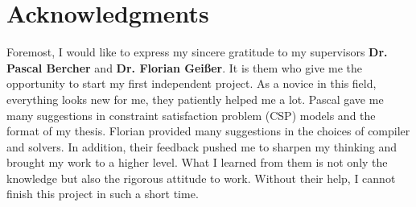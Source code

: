 \chapter*{Acknowledgments}
Foremost, I would like to express my sincere gratitude to my supervisors \textbf{Dr. Pascal Bercher} and \textbf{Dr. Florian Geißer}. It is them who give me the opportunity to start my first independent project. As a novice in this field, everything looks new for me, they patiently helped me a lot. Pascal gave me many suggestions in constraint satisfaction problem (CSP) models and the format of my thesis. Florian provided many suggestions in the choices of compiler and solvers. In addition, their feedback pushed me to sharpen my thinking and brought my work to a higher level. What I learned from them is not only the knowledge but also the rigorous attitude to work. Without their help, I cannot finish this project in such a short time.